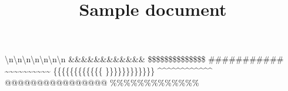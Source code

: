 \documentclass{article}
\title{Sample document}
\begin{document}
\maketitle
\textbackslash n\textbackslash n\textbackslash n\textbackslash n\textbackslash n\textbackslash n\textbackslash n \&\&\&\&\&\&\&\&\&\&\&\& \$\$\$\$\$\$\$\$\$\$\$\$\$\$ \#\#\#\#\#\#\#\#\#\#\# \~{}\~{}\~{}\~{}\~{}\~{}\~{}\~{}\~{}\~{} \{\{\{\{\{\{\{\{\{\{\{\{ \}\}\}\}\}\}\}\}\}\}\}\} \^{}\^{}\^{}\^{}\^{}\^{}\^{}\^{}\^{}\^{}\^{}\^{} @@@@@@@@@@@@@@@@ \%\%\%\%\%\%\%\%\%\%\%\%\%\end{document}
\end{document}
